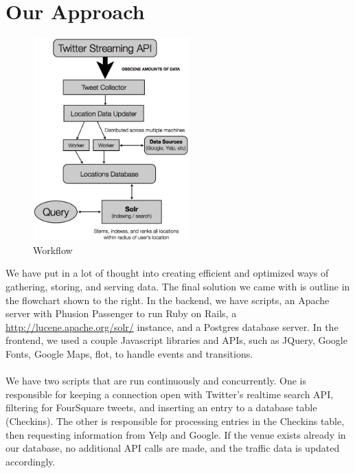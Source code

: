 \documentclass{article}
\begin{document}
\section{Our Approach}
\begin{figure}
\includegraphics[width=6cm]{flowchart.png}
\caption{Workflow}
\end{figure}
We have put in a lot of thought into creating efficient and optimized ways of gathering, storing, and serving data. The final solution
we came with is outline in the flowchart shown to the right. In the backend, we have scripts, an Apache server with Phusion Passenger
to run Ruby on Rails, a \href{Solr}{http://lucene.apache.org/solr/} instance, and a Postgres database server. In the frontend, we used
a couple Javascript libraries and APIs, such as JQuery, Google Fonts, Google Maps, flot, to handle events and transitions. 
\\ \\
We have two scripts that are run continuously and concurrently. One is responsible for keeping a connection open with Twitter's realtime
search API, filtering for FourSquare tweets, and inserting an entry to a database table (Checkins). The other is responsible for processing
entries in the Checkins table, then requesting information from Yelp and Google. If the venue exists already in our database, no additional
API calls are made, and the traffic data is updated accordingly. 
\\ \\

\end{document}
